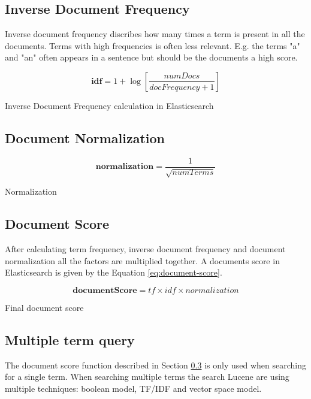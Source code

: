 \subsection{Inverse Document Frequency}
Inverse document frequency discribes how many times a term is present in all the documents.
Terms with high frequencies is often less relevant.
E.g. the terms "a" and "an" often appears in a sentence but should be the documents a high score.


\begin{cequation}[H]
	\begin{equation}
		\mathbf{idf} = 1 + \log{[\frac{numDocs}{docFrequency + 1}]}
	\end{equation}
	\caption{Inverse Document Frequency calculation in Elasticsearch}
  \label{eq:idf}
\end{cequation}

\subsection{Document Normalization}

\begin{cequation}[H]
	\begin{equation}
		\mathbf{normalization} = \frac{1}{\sqrt{numTerms}}
	\end{equation}
	\caption{Normalization}
  \label{eq:normalization}
\end{cequation}

\subsection{Document Score}
\label{sec:doc-score}
After calculating term frequency, inverse document frequency and document normalization all the factors are multiplied together.
A documents score in Elasticsearch is given by the Equation \ref{eq:document-score}.

\begin{cequation}[H]
	\begin{equation}
		\mathbf{documentScore} = tf \times idf \times normalization
	\end{equation}
	\caption{Final document score}
  \label{eq:document-score}
\end{cequation}

\subsection{Multiple term query}
The document score function described in Section \ref{sec:doc-score} is only used when searching for a single term.
When searching multiple terms the search Lucene are using multiple techniques: boolean model, TF/IDF and vector space model.


